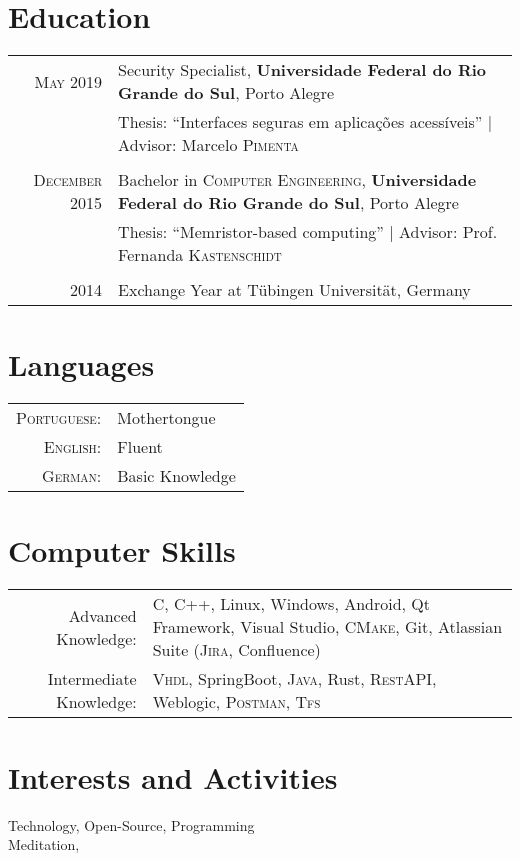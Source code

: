 \documentclass[a4paper,10pt]{article}
\begin{document}
\section{Education}
\begin{tabular}{rl}
    \textsc{May} 2019 & Security Specialist, \textbf{Universidade Federal do Rio Grande do Sul}, Porto Alegre \\
    & Thesis: ``Interfaces seguras em aplicações acessíveis'' | \small Advisor: Marcelo \textsc{Pimenta} \\&\\
    
    \textsc{December} 2015 & Bachelor in \textsc{Computer Engineering}, \textbf{Universidade Federal do Rio Grande do Sul}, Porto Alegre\\
    & Thesis: ``Memristor-based computing'' | \small Advisor: Prof. Fernanda \textsc{Kastenschidt} \\&\\

    2014 & Exchange Year at Tübingen Universität, Germany
\end{tabular}

\section{Languages}
\begin{tabular}{rl}
    \textsc{Portuguese:}&Mothertongue\\
    \textsc{English:}&Fluent\\
    \textsc{German:}&Basic Knowledge\\
\end{tabular}

\section{Computer Skills}
\begin{tabular}{rl}
    Advanced Knowledge:& C, C++, Linux, Windows, Android, Qt Framework, Visual Studio, \textsc{CMake}, Git, Atlassian Suite (\textsc{Jira}, Confluence)\\
    Intermediate Knowledge:& \textsc{Vhdl}, SpringBoot, \textsc{Java}, Rust, \textsc{RestAPI}, Weblogic, \textsc{Postman}, \textsc{Tfs}\\
\end{tabular}

\section{Interests and Activities}
Technology, Open-Source, Programming\\
Meditation, 
\end{document}
